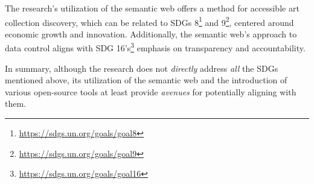The research's utilization of the semantic web offers a method for accessible art collection discovery, which can be related to SDGs 8\footnote{\url{https://sdgs.un.org/goals/goal8}} and 9\footnote{\url{https://sdgs.un.org/goals/goal9}}, centered around economic growth and innovation. Additionally, the semantic web's approach to data control aligns with SDG 16's\footnote{\url{https://sdgs.un.org/goals/goal16}} emphasis on transparency and accountability.

In summary, although the research does not \textit{directly} address \textit{all} the SDGs mentioned above, its utilization of the semantic web and the introduction of various open-source tools at least provide \textit{avenues} for potentially aligning with them.